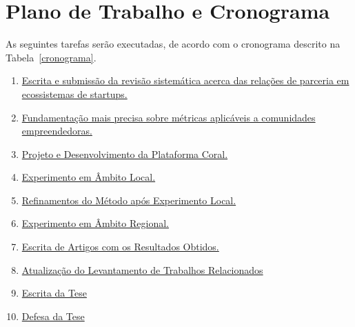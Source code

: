 \section{Plano de Trabalho e Cronograma}
As seguintes tarefas serão executadas, de acordo com o cronograma descrito na Tabela~\ref{cronograma}.
\begin{enumerate}
	
	\item \hypertarget{txtask1}{\hyperlink{task1}{Escrita e submissão da revisão sistemática acerca das relações de parceria em ecossistemas de startups.}}
	\item \hypertarget{txtask2}{\hyperlink{task2}{	Fundamentação mais precisa sobre métricas aplicáveis a comunidades empreendedoras.}}
	\item \hypertarget{txtask3}{\hyperlink{task3}{Projeto e Desenvolvimento da Plataforma Coral.}}
	\item \hypertarget{txtask4}{\hyperlink{task4}{Experimento em Âmbito Local.}}
	\item \hypertarget{txtask5}{\hyperlink{task5}{Refinamentos do Método após Experimento Local.}}
	\item \hypertarget{txtask6}{\hyperlink{task6}{Experimento em Âmbito Regional.}}
	\item \hypertarget{txtask7}{\hyperlink{task7}{	Escrita de Artigos com os Resultados Obtidos.}}
	\item \hypertarget{txtask8}{\hyperlink{task8}{	Atualização do Levantamento de Trabalhos Relacionados}}
	\item \hypertarget{txtask9}{\hyperlink{task9}{Escrita da Tese}}
	\item \hypertarget{txtask10}{\hyperlink{task10}{Defesa da Tese}}
	
\end{enumerate}


